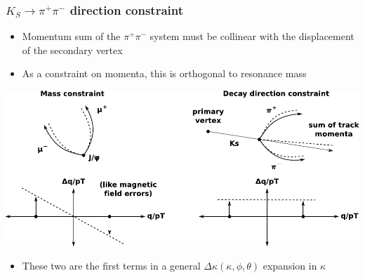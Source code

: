 \documentclass[compress]{beamer}
\begin{document}
\begin{frame}
\frametitle{{\large $K_S \to \pi^+\pi^-$ direction constraint}}

\begin{itemize}
\item Momentum sum of the $\pi^+\pi^-$ system must be collinear with
  the displacement of the secondary vertex

\item As a constraint on momenta, this is orthogonal to resonance mass
\end{itemize}

\includegraphics[width=\linewidth]{diagram.pdf}

\begin{itemize}
\item These two are the first terms in a general $\Delta \kappa(\kappa, \phi, \theta)$ expansion in $\kappa$

\end{itemize}
\end{frame}
\end{document}
